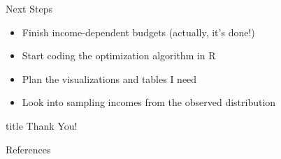 \begin{frame}{Next Steps}
    \begin{itemize}
        \item Finish income-dependent budgets (actually, it's done!)
        \bigskip
        \item Start coding the optimization algorithm in R
        \bigskip
        \item Plan the visualizations and tables I need
        \bigskip
        \item Look into sampling incomes from the observed distribution
    \end{itemize}
\end{frame}   

\begin{frame}
    \vfill
    \centering
    \begin{beamercolorbox}[sep=8pt,center,shadow=true,rounded=true]{title}
      Thank You!
    \end{beamercolorbox}
    \vfill
\end{frame}





\begin{frame}{References}
    
    
\end{frame}    
